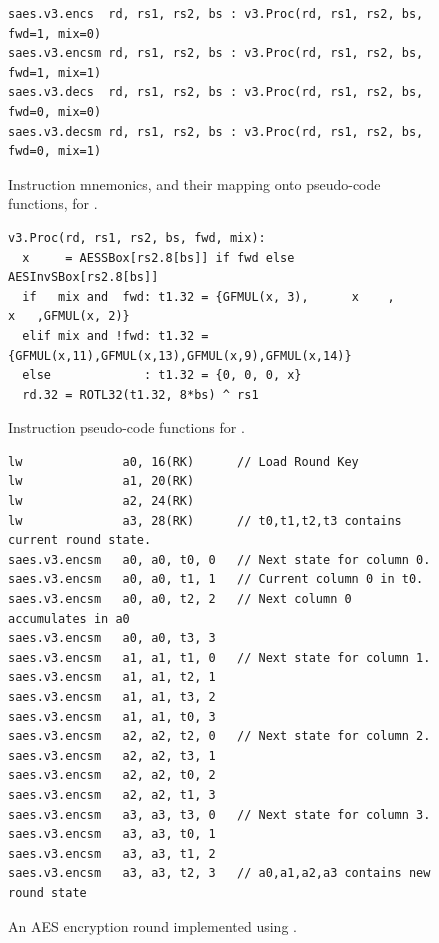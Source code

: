 
\vspace*{\fill}

\begin{figure}[!h]
\begin{lstlisting}[language=pseudo,style=block]
saes.v3.encs  rd, rs1, rs2, bs : v3.Proc(rd, rs1, rs2, bs, fwd=1, mix=0)
saes.v3.encsm rd, rs1, rs2, bs : v3.Proc(rd, rs1, rs2, bs, fwd=1, mix=1)
saes.v3.decs  rd, rs1, rs2, bs : v3.Proc(rd, rs1, rs2, bs, fwd=0, mix=0)
saes.v3.decsm rd, rs1, rs2, bs : v3.Proc(rd, rs1, rs2, bs, fwd=0, mix=1)
\end{lstlisting}
\caption{
  Instruction mnemonics, and their mapping onto pseudo-code functions, for .
}
\label{fig:v3:mnemonics}
\end{figure}

\begin{figure}[!h]
\begin{lstlisting}[language=pseudo,style=block]
v3.Proc(rd, rs1, rs2, bs, fwd, mix):
  x     = AESSBox[rs2.8[bs]] if fwd else AESInvSBox[rs2.8[bs]]
  if   mix and  fwd: t1.32 = {GFMUL(x, 3),      x    ,      x   ,GFMUL(x, 2)}
  elif mix and !fwd: t1.32 = {GFMUL(x,11),GFMUL(x,13),GFMUL(x,9),GFMUL(x,14)}
  else             : t1.32 = {0, 0, 0, x}
  rd.32 = ROTL32(t1.32, 8*bs) ^ rs1
\end{lstlisting}
\caption{
  Instruction pseudo-code functions for .
}
\label{fig:v3:pseudo}
\end{figure}

\begin{figure}[!h]
\begin{lstlisting}[language=pseudo,style=block]
lw              a0, 16(RK)      // Load Round Key
lw              a1, 20(RK)
lw              a2, 24(RK)
lw              a3, 28(RK)      // t0,t1,t2,t3 contains current round state.
saes.v3.encsm   a0, a0, t0, 0   // Next state for column 0.
saes.v3.encsm   a0, a0, t1, 1   // Current column 0 in t0.
saes.v3.encsm   a0, a0, t2, 2   // Next column 0 accumulates in a0
saes.v3.encsm   a0, a0, t3, 3
saes.v3.encsm   a1, a1, t1, 0   // Next state for column 1.
saes.v3.encsm   a1, a1, t2, 1
saes.v3.encsm   a1, a1, t3, 2
saes.v3.encsm   a1, a1, t0, 3
saes.v3.encsm   a2, a2, t2, 0   // Next state for column 2.
saes.v3.encsm   a2, a2, t3, 1
saes.v3.encsm   a2, a2, t0, 2
saes.v3.encsm   a2, a2, t1, 3
saes.v3.encsm   a3, a3, t3, 0   // Next state for column 3.
saes.v3.encsm   a3, a3, t0, 1
saes.v3.encsm   a3, a3, t1, 2
saes.v3.encsm   a3, a3, t2, 3   // a0,a1,a2,a3 contains new round state
\end{lstlisting}
\caption{
  An AES encryption round implemented using .
}
\label{fig:v3:round}
\end{figure}

